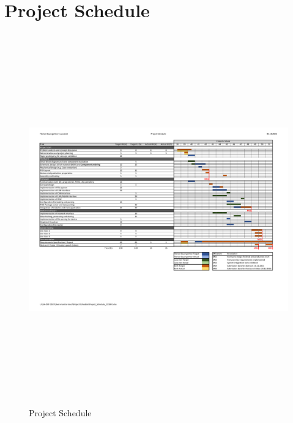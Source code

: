 \newpage
\section{Project Schedule}
\label{sec:project_schedule}

\begin{figure}[h!]
	\centering
	\includegraphics[height=16cm, angle=90, trim=15mm 0mm 17mm 0mm, clip]{images/Project_Schedule_211001}
	\caption{Project Schedule}
	\vspace{-2ex}
	\label{fig:project_schedule}
\end{figure}
